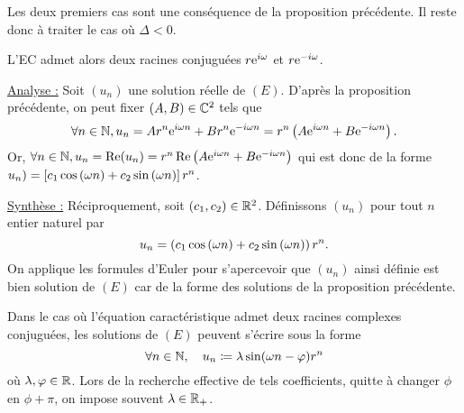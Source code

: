 \documentclass{magnoliaold}
\begin{document}
\begin{preuve}
Les deux premiers cas sont une conséquence de la proposition précédente. Il reste donc à traiter le cas où $\Delta<0$.

L'EC admet alors deux racines conjuguées $r{\rm e}^{i\omega}$ et $r{\rm e}^{-i\omega}$. 

\underline{Analyse :} Soit $(u_n)$ une solution réelle de $(E)$. D'après la proposition précédente, on peut fixer $(A,B)\in \mathbb{C}^2$ tels que \[\forall n\in\mathbb{N}, u_n=Ar^n{\rm e}^{i\omega n}+Br^n{\rm e}^{-i\omega n}=r^n\left(A{\rm e}^{i\omega n}+B{\rm e}^{-i\omega n}\right).\]
Or, $\forall n\in\mathbb{N}, u_n=\mathop{\rm Re}(u_n)=r^n\mathop{\rm Re}\left(A{\rm e}^{i\omega n}+B{\rm e}^{-i\omega n}\right)$ qui est donc de la forme $u_n)=\left[c_1\cos\left(\omega n\right)+c_2\sin\left(\omega n\right)\right]r^n$.

\underline{Synthèse :} Réciproquement, soit $(c_1,c_2)\in\mathbb{R}^2$. Définissons $(u_n)$ pour tout $n$ entier naturel par $$u_n=\left(c_1\cos\left(\omega n\right)+c_2\sin\left(\omega n\right)\right)r^n.$$
On applique les formules d'Euler pour s'apercevoir que $(u_n)$ ainsi définie est bien solution de $(E)$ car de la forme des solutions de la proposition précédente.

\end{preuve}

\begin{remarqueUnique}
\remarque Dans le cas où l'équation caractéristique admet deux racines
  complexes conjuguées, les solutions de $(E)$ peuvent s'écrire sous la forme
  \[\forall n\in\mathbb{N} ,\quad u_n\coloneqq\lambda\sin(\omega n-\varphi) r^n\]
  où $\lambda,\varphi\in\mathbb{R}$.
  Lors de la recherche effective de tels coefficients, 
  quitte à changer $\phi$ en $\phi+\pi$, on impose souvent $\lambda\in\mathbb{R}_+$.
\end{remarqueUnique}
\end{document}
